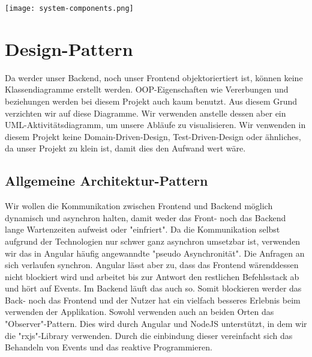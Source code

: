 	\noindent
	\texttt{[image: system-components.png]}

	\section{Design-Pattern}
	Da werder unser Backend, noch unser Frontend objektoriertiert ist, können keine Klassendiagramme erstellt werden. OOP-Eigenschaften wie Vererbungen und beziehungen werden bei diesem Projekt auch kaum benutzt. Aus diesem Grund verzichten wir auf diese Diagramme. Wir verwenden anstelle dessen aber ein UML-Aktivitätsdiagramm, um unsere Abläufe zu visualisieren. Wir venwenden in diesem Projekt keine Domain-Driven-Design, Test-Driven-Design oder ähnliches, da unser Projekt zu klein ist, damit dies den Aufwand wert wäre.

	\subsection{Allgemeine Architektur-Pattern}
	Wir wollen die Kommunikation zwischen Frontend und Backend möglich dynamisch und asynchron halten, damit weder das Front- noch das Backend lange Wartenzeiten aufweist oder "einfriert". Da die Kommunikation selbst aufgrund der Technologien nur schwer ganz asynchron umsetzbar ist, verwenden wir das in Angular häufig angewanndte "pseudo Asynchronität". Die Anfragen an sich verlaufen synchron. Angular lässt aber zu, dass das Frontend wärenddessen nicht blockiert wird und arbeitet bis zur Antwort den restlichen Befehlsstack ab und hört auf Events. Im Backend läuft das auch so. Somit blockieren werder das Back- noch das Frontend und der Nutzer hat ein vielfach besseres Erlebnis beim verwenden der Applikation. Sowohl verwenden auch an beiden Orten das "Observer"-Pattern. Dies wird durch Angular und NodeJS unterstützt, in dem wir die "rxjs"-Library verwenden. Durch die einbindung dieser vereinfacht sich das Behandeln von Events und das reaktive Programmieren.

